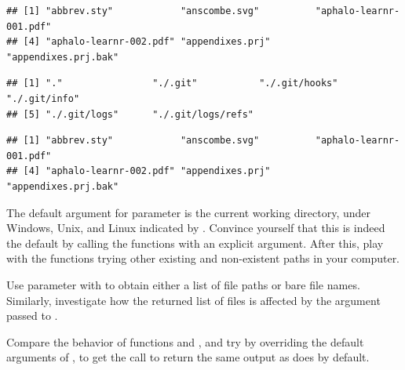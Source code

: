 \documentclass[krantz2]{krantz}\usepackage{knitr}
\begin{document}
\begin{knitrout}\footnotesize
{}\color{fgcolor}\begin{kframe}
\begin{alltt}
\hlstd{(}\hlstd{())}
\end{alltt}
\begin{verbatim}
## [1] "abbrev.sty"            "anscombe.svg"          "aphalo-learnr-001.pdf"
## [4] "aphalo-learnr-002.pdf" "appendixes.prj"        "appendixes.prj.bak"
\end{verbatim}
\begin{alltt}
\hlstd{(}\hlstd{())}
\end{alltt}
\begin{verbatim}
## [1] "."                "./.git"           "./.git/hooks"     "./.git/info"     
## [5] "./.git/logs"      "./.git/logs/refs"
\end{verbatim}
\begin{alltt}
\hlstd{(}\hlstd{())}
\end{alltt}
\begin{verbatim}
## [1] "abbrev.sty"            "anscombe.svg"          "aphalo-learnr-001.pdf"
## [4] "aphalo-learnr-002.pdf" "appendixes.prj"        "appendixes.prj.bak"
\end{verbatim}
\end{kframe}
\end{knitrout}

\begin{playground}
The default argument for parameter  is the current working directory, under Windows, Unix, and Linux indicated by . Convince yourself that this is indeed the default by calling the functions with an explicit argument. After this, play with the functions trying other existing and non-existent paths in your computer.
\end{playground}

\begin{playground}
Use parameter  with  to obtain either a list of file paths or bare file names. Similarly, investigate how the returned list of files is affected by the argument passed to .
\end{playground}

\begin{playground}
Compare the behavior of functions  and , and try by overriding the default arguments of , to get the call to return the same output as  does by default.
\end{playground}
\end{document}
